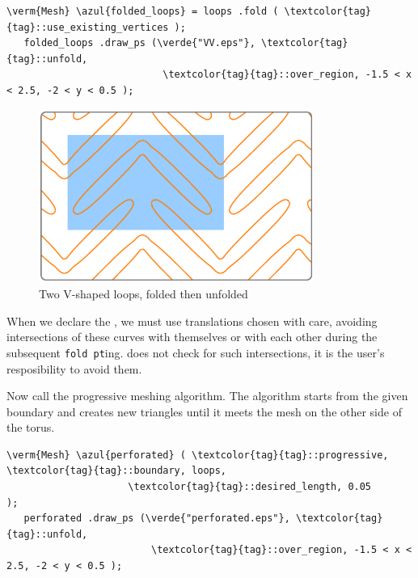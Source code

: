 \begin{Verbatim}[commandchars=\\\{\},formatcom=\small\tt,frame=single,
   rulecolor=\color{coment},baselinestretch=0.94,framesep=2mm         ]
   \verm{Mesh} \azul{folded_loops} = loops .fold ( \textcolor{tag}{tag}::use_existing_vertices );
   folded_loops .draw_ps (\verde{"VV.eps"}, \textcolor{tag}{tag}::unfold,
                           \textcolor{tag}{tag}::over_region, -1.5 < x < 2.5, -2 < y < 0.5 );
\end{Verbatim}

\begin{figure}[ht] \centering
  \includegraphics[width=90mm]{boomerang-2.eps}
  \caption{Two V-shaped loops, folded then unfolded}
  \label{\numb section 7.\numb fig 15}
\end{figure}

When we declare the {\small\tt{}}, we must use translations chosen with care,
avoiding intersections of these curves with themselves or with each other during the subsequent
\mbox{{\small\tt fold pt}ing}.
\ManiFEM{} does not check for such intersections, it is the user's resposibility to avoid them.

Now call the progressive meshing algorithm.
The algorithm starts from the given boundary and creates new triangles until
it meets the mesh on the other side of the torus.

\begin{Verbatim}[commandchars=\\\{\},formatcom=\small\tt,frame=single,
   label=code not working,rulecolor=\color{coment},
   baselinestretch=0.94,framesep=2mm                                   ]
   \verm{Mesh} \azul{perforated} ( \textcolor{tag}{tag}::progressive, \textcolor{tag}{tag}::boundary, loops,
                     \textcolor{tag}{tag}::desired_length, 0.05              );
   perforated .draw_ps (\verde{"perforated.eps"}, \textcolor{tag}{tag}::unfold,
                         \textcolor{tag}{tag}::over_region, -1.5 < x < 2.5, -2 < y < 0.5 );
\end{Verbatim}

